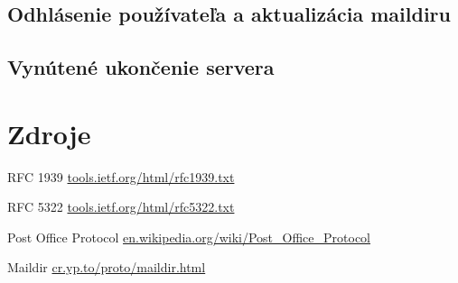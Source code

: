 \documentclass[11pt,a4paper]{article}
\begin{document}
	\subsection{Odhlásenie používateľa a aktualizácia maildiru}
	\subsection{Vynútené ukončenie servera}

\newpage %

\section{Zdroje}
\begin{enumerate}[label={[\arabic*]}]
	\item RFC 1939 \href{https://tools.ietf.org/html/rfc1939.txt}{tools.ietf.org/html/rfc1939.txt}
	\item RFC 5322 \href{https://tools.ietf.org/html/rfc5322.txt}{tools.ietf.org/html/rfc5322.txt}
	\item Post Office Protocol \href{https://en.wikipedia.org/wiki/Post_Office_Protocol}{en.wikipedia.org/wiki/Post\_Office\_Protocol}
	\item Maildir \href{https://cr.yp.to/proto/maildir.html}{cr.yp.to/proto/maildir.html}
\end{enumerate}
\end{document}
